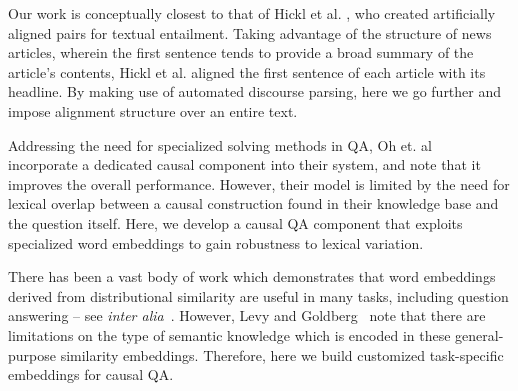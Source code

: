 Our work is conceptually closest to that of Hickl et al. \citeyear{hickl2006recognizing}, who created artificially aligned pairs for textual entailment.  Taking advantage of the structure of news articles, wherein the first sentence tends to provide a broad summary of the article's contents, Hickl et al. aligned the first sentence of each article with its headline.  By making use of automated discourse parsing, here we go further and impose alignment structure over an entire text.



Addressing the need for %
specialized solving methods in QA, 
Oh et. al~\citeyear{oh2013question} incorporate a dedicated causal component into their system, and note that it improves the overall performance.  However, their model is limited by the need for lexical overlap between a causal construction found in their knowledge base and the question itself.  Here, we develop a causal QA component that exploits specialized word embeddings to gain robustness to lexical variation.  

There has been a vast body of work which demonstrates that word embeddings derived from distributional similarity are useful in many tasks, including question answering -- see \emph{inter alia}~\mbox{\cite{fried2015higher,yih13}}.  However, Levy and Goldberg~\citeyear{levy2015supervised} note that there are limitations on the type of semantic knowledge which is encoded in these general-purpose similarity embeddings. 
Therefore, here we build customized task-specific embeddings for causal QA.

